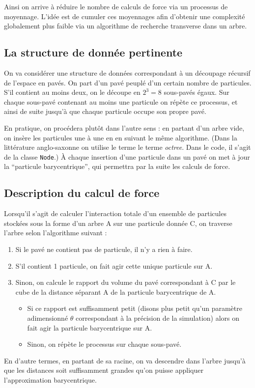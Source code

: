 \documentclass[12pt, letterpaper, twoside]{article}
\newcommand{\T}[1]{\texttt{#1}}
\begin{document}
Ainsi on arrive à réduire le nombre de calculs de force via un processus de moyennage. L'idée est de cumuler ces moyennages afin d'obtenir une complexité globalement plus faible via un algorithme de recherche transverse dans un arbre.

\subsection*{La structure de donnée pertinente}
On va considérer une structure de données correspondant à un découpage récursif de l'espace en pavés. On part d'un pavé peuplé d'un certain nombre de particules. S'il contient au moins deux, on le découpe en $2^3 = 8$ sous-pavés égaux. Sur chaque sous-pavé contenant au moins une particule on répète ce processus, et ainsi de suite jusqu'à que chaque particule occupe son propre pavé.

En pratique, on procédera plutôt dans l'autre sens : en partant d'un arbre vide, on insère les particules une à une en en suivant le même algorithme. (Dans la littérature anglo-saxonne on utilise le terme le terme \textit{octree}. Dans le code, il s'agit de la classe \T{Node}.) À chaque insertion d'une particule dans un pavé on met à jour la ``particule barycentrique'', qui permettra par la suite les calculs de force.

\subsection*{Description du calcul de force}
Lorsqu'il s'agit de calculer l'interaction totale d'un ensemble de particules stockées sous la forme d'un arbre A sur une particule donnée C, on traverse l'arbre selon l'algorithme suivant :

\begin{enumerate}
	\item Si le pavé ne contient pas de particule, il n'y a rien à faire.
	\item S'il contient 1 particule, on fait agir cette unique particule sur A.
	\item Sinon, on calcule le rapport du volume du pavé correspondant à C par le cube de la distance séparant A de la particule barycentrique de A.
\begin{itemize}
	\item Si ce rapport est suffisamment petit (disons plus petit qu'un paramètre adimensionné $\theta$ correspondant à la précision de la simulation) alors on fait agir la particule barycentrique sur A.
	\item Sinon, on répète le processus sur chaque sous-pavé.
\end{itemize}
\end{enumerate}
En d'autre termes, en partant de sa racine, on va descendre dans l'arbre jusqu'à que les distances soit suffisamment grandes qu'on puisse appliquer l'approximation barycentrique.
\end{document}
